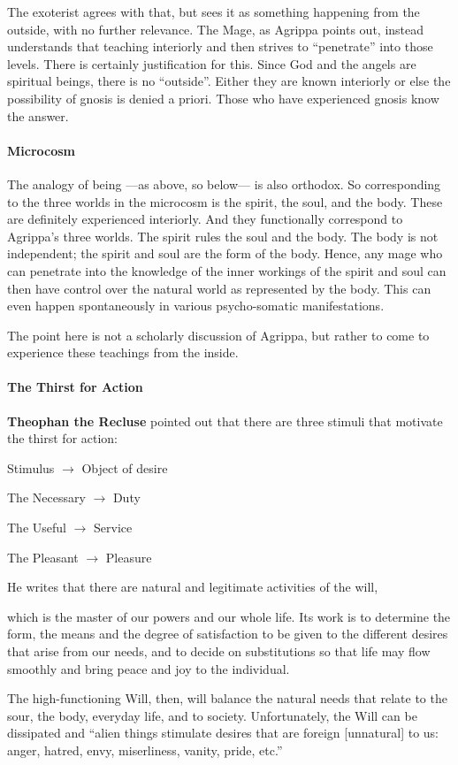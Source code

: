 The exoterist agrees with that, but sees it as something happening from the outside, with no further relevance. The Mage, as Agrippa points out, instead understands that teaching interiorly and then strives to “penetrate” into those levels. There is certainly justification for this. Since God and the angels are spiritual beings, there is no “outside”. Either they are known interiorly or else the possibility of gnosis is denied a priori. Those who have experienced gnosis know the answer.

\paragraph{Microcosm}
The analogy of being —as above, so below— is also orthodox. So corresponding to the three worlds in the microcosm is the spirit, the soul, and the body. These are definitely experienced interiorly. And they functionally correspond to Agrippa’s three worlds. The spirit rules the soul and the body. The body is not independent; the spirit and soul are the form of the body. Hence, any mage who can penetrate into the knowledge of the inner workings of the spirit and soul can then have control over the natural world as represented by the body. This can even happen spontaneously in various psycho-somatic manifestations.

The point here is not a scholarly discussion of Agrippa, but rather to come to experience these teachings from the inside.

\paragraph{The Thirst for Action}
\textbf{Theophan the Recluse} pointed out that there are three stimuli that motivate the thirst for action:

Stimulus $\rightarrow$ Object of desire

The Necessary $\rightarrow$ Duty

The Useful $\rightarrow$ Service

The Pleasant $\rightarrow$ Pleasure

He writes that there are natural and legitimate activities of the will,

\begin{quotex}
which is the master of our powers and our whole life. Its work is to determine the form, the means and the degree of satisfaction to be given to the different desires that arise from our needs, and to decide on substitutions so that life may flow smoothly and bring peace and joy to the individual.

\end{quotex}
The high-functioning Will, then, will balance the natural needs that relate to the sour, the body, everyday life, and to society. Unfortunately, the Will can be dissipated and “alien things stimulate desires that are foreign [unnatural] to us: anger, hatred, envy, miserliness, vanity, pride, etc.”

